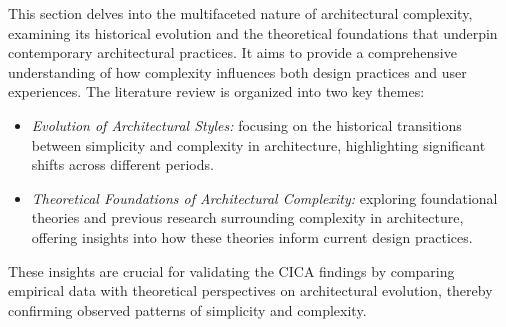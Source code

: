 






This section delves into the multifaceted nature of architectural complexity, examining its historical evolution and the theoretical foundations that underpin contemporary architectural practices.
It aims to provide a comprehensive understanding of how complexity influences both design practices and user experiences.
The literature review is organized into two key themes:

\begin{itemize}
    \item \textit{Evolution of Architectural Styles:} focusing on the historical transitions between simplicity and complexity in architecture, highlighting significant shifts across different periods.
    \item \textit{Theoretical Foundations of Architectural Complexity:} exploring foundational theories and previous research surrounding complexity in architecture, offering insights into how these theories inform current design practices.
\end{itemize}

These insights are crucial for validating the CICA findings by comparing empirical data with theoretical perspectives on architectural evolution, thereby confirming observed patterns of simplicity and complexity.

